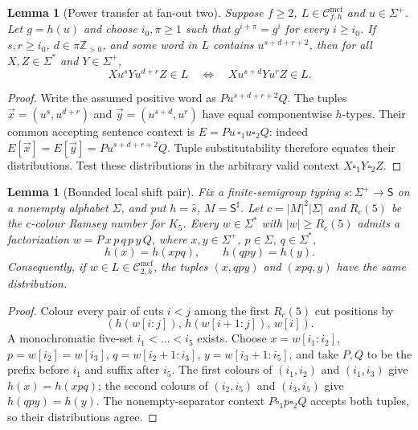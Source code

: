 \documentclass[11pt]{article}
\numberwithin{equation}{section}
\theoremstyle{plain}
\newtheorem{lemma}[theorem]{Lemma}
\theoremstyle{definition}
\theoremstyle{remark}
\newcommand{\Cmcf}[2]{\mathcal{C}^{\mathrm{mcf}}_{#1,#2}}
\newcommand{\tuple}[1]{\vec{#1}}
\newcommand{\blank}{\square}
\theoremstyle{plain}
\begin{document}
\begin{lemma}[Power transfer at fan-out two]
\label{lem:mcfg-power-transfer}
Suppose $f\ge2$, $L\in\Cmcf{f}{h}$ and $u\in\Sigma^+$.
Let $g=h(u)$ and choose $i_0,\pi\ge1$ such that
$g^{i+\pi}=g^i$ for every $i\ge i_0$.
If $s,r\ge i_0$, $d\in\pi\mathbb Z_{>0}$, and some
word in $L$ contains $u^{s+d+r+2}$, then for
all $X,Z\in\Sigma^*$ and $Y\in\Sigma^+$,
\[
 Xu^sYu^{d+r}Z\in L
 \quad\Longleftrightarrow\quad
 Xu^{s+d}Yu^rZ\in L.
\]
\end{lemma}
\begin{proof}
Write the assumed positive word as $Pu^{s+d+r+2}Q$.
The tuples $\tuple x=(u^s,u^{d+r})$ and
$\tuple y=(u^{s+d},u^r)$ have equal componentwise
$h$-types.  Their common accepting sentence context
is $E=Pu\,\blank_1u\blank_2Q$: indeed
$E[\tuple x]=E[\tuple y]=Pu^{s+d+r+2}Q$.
Tuple substitutability therefore equates their
distributions.  Test these distributions in the
arbitrary valid context $X\blank_1Y\blank_2Z$.
\end{proof}

\begin{lemma}[Bounded local shift pair]
\label{lem:mcfg-local-shift}
Fix a finite-semigroup typing $s:\Sigma^+\to\mathsf S$ on a nonempty
alphabet $\Sigma$, and put $h=\widehat s$, $M=\mathsf S^\sharp$.
Let $c=|M|^2|\Sigma|$
and $R_c(5)$ be the
$c$-colour Ramsey number for $K_5$.
Every $w\in\Sigma^*$ with $|w|\ge R_c(5)$
admits a factorization
$w=P\,x\,p\,q\,p\,y\,Q$,
where $x,y\in\Sigma^+$, $p\in\Sigma$, $q\in\Sigma^*$,
\[
 h(x)=h(xpq),\qquad h(qpy)=h(y).
\]
Consequently, if $w\in L\in\Cmcf{2}{h}$, the tuples
$(x,qpy)$ and $(xpq,y)$ have the same distribution.
\end{lemma}
\begin{proof}
Colour every pair of cuts $i<j$ among the first
$R_c(5)$ cut positions by
\[
 (h(w[i:j]),\,h(w[i+1:j]),\,w[i]).
\]
A monochromatic five-set $i_1<\dots<i_5$ exists.
Choose $x=w[i_1:i_2]$, $p=w[i_2]=w[i_3]$,
$q=w[i_2+1:i_3]$,
$y=w[i_3+1:i_5]$, and take $P,Q$ to be
the prefix before $i_1$ and suffix after $i_5$.
The first colours of $(i_1,i_2)$ and $(i_1,i_3)$
give $h(x)=h(xpq)$; the second colours of
$(i_2,i_5)$ and $(i_3,i_5)$ give $h(qpy)=h(y)$.
The nonempty-separator context
$P\blank_1p\blank_2Q$ accepts both tuples,
so their distributions agree.
\end{proof}
\end{document}
